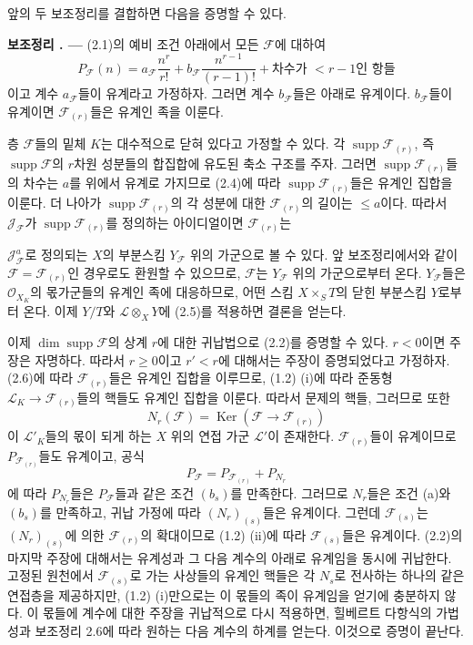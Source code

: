 \documentclass[11pt,twoside,openany]{book}
\numberwithin{equation}{section}
\newcommand{\sourceunit}{front}
\newcommand{\src}[1]{%
  \phantomsection\hypertarget{src:\sourceunit:#1}{}%
  \marginpar{\raggedleft\footnotesize\sffamily #1}%
}
\theoremstyle{plain}
\theoremstyle{definition}
\theoremstyle{remark}
\newcommand{\result}[2]{%
  \par\medskip\noindent\textbf{#1%
  \if\relax\detokenize{#2}\relax\else\space#2\fi. ---}\enspace
}
\begin{document}
앞의 두 보조정리를 결합하면 다음을 증명할 수 있다.

\result{보조정리}{2.6} (2.1)의 예비 조건 아래에서 모든 $\mathcal F$에
대하여
\[
P_{\mathcal F}(n)=a_{\mathcal F}\frac{n^r}{r!}
+b_{\mathcal F}\frac{n^{r-1}}{(r-1)!}
+\text{차수가 $<r-1$인 항들}
\]
이고 계수 $a_{\mathcal F}$들이 유계라고 가정하자. 그러면 계수
$b_{\mathcal F}$들은 아래로 유계이다. $b_{\mathcal F}$들이 유계이면
$\mathcal F_{(r)}$들은 유계인 족을 이룬다.

층 $\mathcal F$들의 밑체 $K$는 대수적으로 닫혀 있다고 가정할 수 있다.
각 $\operatorname{supp}\mathcal F_{(r)}$, 즉
$\operatorname{supp}\mathcal F$의 $r$차원 성분들의 합집합에 유도된
축소 구조를 주자. 그러면 $\operatorname{supp}\mathcal F_{(r)}$들의
차수는 $a$를 위에서 유계로 가지므로 (2.4)에 따라
$\operatorname{supp}\mathcal F_{(r)}$들은 유계인 집합을 이룬다. 더
나아가 $\operatorname{supp}\mathcal F_{(r)}$의 각 성분에 대한
$\mathcal F_{(r)}$의 길이는 $\leq a$이다. 따라서
$\mathcal J_{\mathcal F}$가 $\operatorname{supp}\mathcal F_{(r)}$를
정의하는 아이디얼이면 $\mathcal F_{(r)}$는
\src{258}
$\mathcal J_{\mathcal F}^{a}$로 정의되는 $X$의 부분스킴
$Y_{\mathcal F}$ 위의 가군으로 볼 수 있다. 앞 보조정리에서와 같이
$\mathcal F=\mathcal F_{(r)}$인 경우로도 환원할 수 있으므로,
$\mathcal F$는 $Y_{\mathcal F}$ 위의 가군으로부터 온다.
$Y_{\mathcal F}$들은 $\mathcal O_{X_K}$의 몫가군들의 유계인 족에
대응하므로, 어떤 스킴 $X\times_S T$의 닫힌 부분스킴 $Y$로부터 온다.
이제 $Y/T$와 $\mathcal L\otimes_XY$에 (2.5)를 적용하면 결론을 얻는다.

이제 $\dim\operatorname{supp}\mathcal F$의 상계 $r$에 대한 귀납법으로
(2.2)를 증명할 수 있다. $r<0$이면 주장은 자명하다. 따라서 $r\geq0$이고
$r'<r$에 대해서는 주장이 증명되었다고 가정하자. (2.6)에 따라
$\mathcal F_{(r)}$들은 유계인 집합을 이루므로, (1.2) (i)에 따라
준동형 $\mathcal L_K\longrightarrow\mathcal F_{(r)}$들의 핵들도
유계인 집합을 이룬다. 따라서 문제의 핵들, 그러므로 또한
\[
N_r(\mathcal F)=\operatorname{Ker}(\mathcal F\longrightarrow\mathcal F_{(r)})
\]
이 $\mathcal L'_K$들의 몫이 되게 하는 $X$ 위의 연접 가군
$\mathcal L'$이 존재한다. $\mathcal F_{(r)}$들이 유계이므로
$P_{\mathcal F_{(r)}}$들도 유계이고, 공식
\[
P_{\mathcal F}=P_{\mathcal F_{(r)}}+P_{N_r}
\]
에 따라 $P_{N_r}$들은 $P_{\mathcal F}$들과 같은 조건 $(b_s)$를
만족한다. 그러므로 $N_r$들은 조건 (a)와 $(b_s)$를 만족하고, 귀납
가정에 따라 $(N_r)_{(s)}$들은 유계이다. 그런데 $\mathcal F_{(s)}$는
$(N_r)_{(s)}$에 의한 $\mathcal F_{(r)}$의 확대이므로 (1.2) (ii)에 따라
$\mathcal F_{(s)}$들은 유계이다. (2.2)의 마지막 주장에 대해서는
유계성과 그 다음 계수의 아래로 유계임을 동시에 귀납한다. 고정된
원천에서 $\mathcal F_{(s)}$로 가는 사상들의 유계인 핵들은 각 $N_s$로
전사하는 하나의 같은 연접층을 제공하지만, (1.2) (i)만으로는 이
몫들의 족이 유계임을 얻기에 충분하지 않다. 이 몫들에 계수에 대한
주장을 귀납적으로 다시 적용하면, 힐베르트 다항식의 가법성과 보조정리
2.6에 따라 원하는 다음 계수의 하계를 얻는다.
이것으로 증명이 끝난다.
\end{document}
